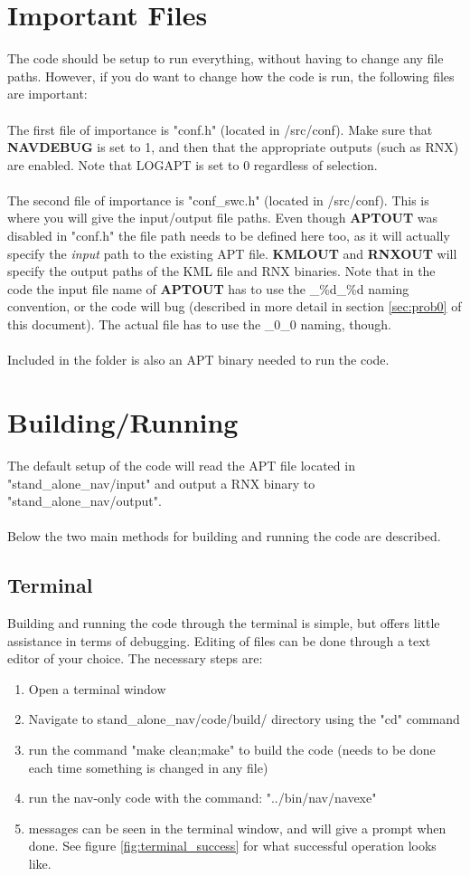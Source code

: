 \documentclass[10pt,a4paper]{article}
\begin{document}
\section{Important Files}
\label{sec:files}
The code should be setup to run everything, without having to change any file paths. However, if you do want to change how the code is run, the following files are important: \\ \\
\noindent
The first file of importance is "conf.h" (located in /src/conf). Make sure that \textbf{NAVDEBUG} is set to 1, and then that the appropriate outputs (such as RNX) are enabled. Note that LOGAPT is set to 0 regardless of selection. \\ \\
\noindent
The second file of importance is "conf\_swc.h" (located in /src/conf). This is where you will give the input/output file paths. Even though \textbf{APTOUT} was disabled in "conf.h" the file path needs to be defined here too, as it will actually specify the \textit{input} path to the existing APT file. \textbf{KMLOUT} and \textbf{RNXOUT} will specify the output paths of the KML file and RNX binaries. Note that in the code the input file name of \textbf{APTOUT} has to use the \_\%d\_\%d naming convention, or the code will bug (described in more detail in section \ref{sec:prob0} of this document). The actual file has to use the \_0\_0 naming, though.  \\ \\ 
\noindent
Included in the folder is also an APT binary needed to run the code.

\section{Building/Running}
The default setup of the code will read the APT file located in "stand\_alone\_nav/input" and output a RNX binary to "stand\_alone\_nav/output". \\ \\
\noindent
Below the two main methods for building and running the code are described.
\subsection{Terminal}
Building and running the code through the terminal is simple, but offers little assistance in terms of debugging. Editing of files can be done through a text editor of your choice. The necessary steps are:
\begin{enumerate}
\item Open a terminal window
\item Navigate to stand\_alone\_nav/code/build/ directory using the "cd" command
\item run the command "make clean;make" to build the code (needs to be done each time something is changed in any file)
\item run the nav-only code with the command: "../bin/nav/navexe"
\item messages can be seen in the terminal window, and will give a prompt when done. See figure \ref{fig:terminal_success} for what successful operation looks like.
\end{enumerate}
\end{document}
